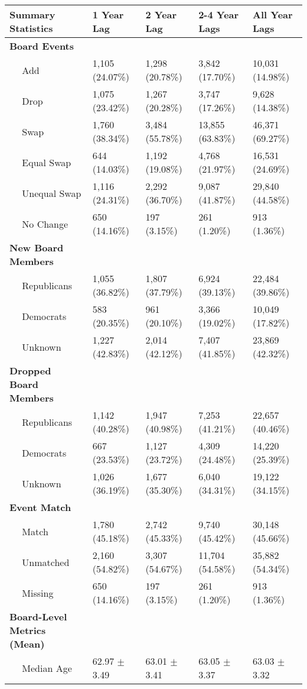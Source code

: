 
\begin{tabular}{lllll}
\toprule
Summary Statistics & 1 Year Lag & 2 Year Lag & 2-4 Year Lags & All Year Lags\\
\midrule
\bf{Board Events} & ~ & ~ & ~ & ~\\
~~ Add & 1,105 (24.07\%) & 1,298 (20.78\%) & 3,842 (17.70\%) & 10,031 (14.98\%)\\
~~ Drop & 1,075 (23.42\%) & 1,267 (20.28\%) & 3,747 (17.26\%) & 9,628 (14.38\%)\\
~~ Swap & 1,760 (38.34\%) & 3,484 (55.78\%) & 13,855 (63.83\%) & 46,371 (69.27\%)\\
~~ Equal Swap & 644 (14.03\%) & 1,192 (19.08\%) & 4,768 (21.97\%) & 16,531 (24.69\%)\\
\addlinespace
~~ Unequal Swap & 1,116 (24.31\%) & 2,292 (36.70\%) & 9,087 (41.87\%) & 29,840 (44.58\%)\\
~~ No Change & 650 (14.16\%) & 197 (3.15\%) & 261 (1.20\%) & 913 (1.36\%)\\
\bf{New Board Members} & ~ & ~ & ~ & ~\\
~~ Republicans & 1,055 (36.82\%) & 1,807 (37.79\%) & 6,924 (39.13\%) & 22,484 (39.86\%)\\
~~ Democrats & 583 (20.35\%) & 961 (20.10\%) & 3,366 (19.02\%) & 10,049 (17.82\%)\\
\addlinespace
~~ Unknown & 1,227 (42.83\%) & 2,014 (42.12\%) & 7,407 (41.85\%) & 23,869 (42.32\%)\\
\bf{Dropped Board Members} & ~ & ~ & ~ & ~\\
~~ Republicans & 1,142 (40.28\%) & 1,947 (40.98\%) & 7,253 (41.21\%) & 22,657 (40.46\%)\\
~~ Democrats & 667 (23.53\%) & 1,127 (23.72\%) & 4,309 (24.48\%) & 14,220 (25.39\%)\\
~~ Unknown & 1,026 (36.19\%) & 1,677 (35.30\%) & 6,040 (34.31\%) & 19,122 (34.15\%)\\
\addlinespace
\bf{Event Match} & ~ & ~ & ~ & ~\\
~~ Match & 1,780 (45.18\%) & 2,742 (45.33\%) & 9,740 (45.42\%) & 30,148 (45.66\%)\\
~~ Unmatched & 2,160 (54.82\%) & 3,307 (54.67\%) & 11,704 (54.58\%) & 35,882 (54.34\%)\\
~~ Missing & 650 (14.16\%) & 197 (3.15\%) & 261 (1.20\%) & 913 (1.36\%)\\
\bf{Board-Level Metrics (Mean)} & ~ & ~ & ~ & ~\\
\addlinespace
~~ Median Age & 62.97 $\pm$ 3.49 & 63.01 $\pm$ 3.41 & 63.05 $\pm$ 3.37 & 63.03 $\pm$ 3.32\\

\end{tabular}
